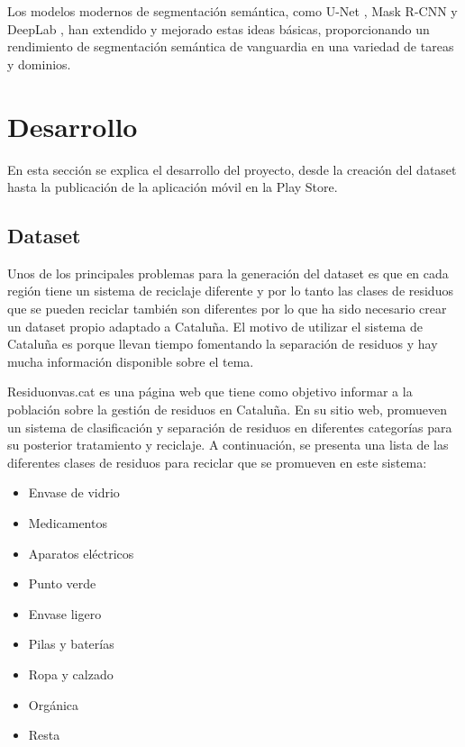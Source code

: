 \documentclass[10pt,a4paper,twocolumn,twoside]{article}
\begin{document}
Los modelos modernos de segmentación semántica, como U-Net \cite{unet}, Mask R-CNN \cite{maskrcnn} y DeepLab \cite{deeplab}, han extendido y mejorado estas ideas básicas, proporcionando un rendimiento de segmentación semántica de vanguardia en una variedad de tareas y dominios.

\section{Desarrollo}

En esta sección se explica el desarrollo del proyecto, desde la creación del dataset hasta la publicación de la aplicación móvil en la Play Store.

\subsection{Dataset}

Unos de los principales problemas para la generación del dataset es que en cada región tiene un sistema de
reciclaje diferente y por lo tanto las clases de residuos que se pueden reciclar también son diferentes por lo que
ha sido necesario crear un dataset propio adaptado a Cataluña. El motivo de utilizar el sistema de Cataluña
es porque llevan tiempo fomentando la separación de residuos y hay mucha información disponible sobre el tema.

Residuonvas.cat es una página web que tiene como objetivo informar a la población sobre la gestión de residuos
en Cataluña. En su sitio web, promueven un sistema de clasificación y separación de residuos en diferentes
categorías para su posterior tratamiento y reciclaje. A continuación, se presenta una lista de las diferentes
clases de residuos para reciclar que se promueven en este sistema:

\setlength{\columnsep}{0cm}
\begin{center}
\begin{multicols}{2}
  \begin{itemize}[noitemsep, leftmargin=*]
  \item[] Envase de vidrio
  \item[] Medicamentos
  \item[] Aparatos eléctricos
  \item[] Punto verde
  \columnbreak
  \item[] Envase ligero
  \item[] Pilas y baterías
  \item[] Ropa y calzado
  \item[] Orgánica
  \item[] Resta
  \end{itemize}
  \end{multicols}
\end{center}
\end{document}
